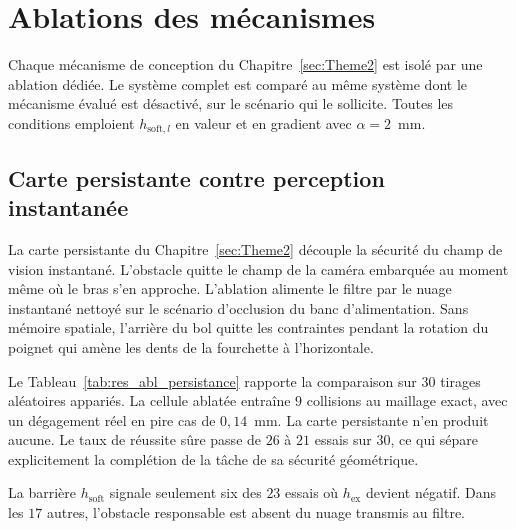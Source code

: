 \FloatBarrier

\section{Ablations des mécanismes}\label{sec:res_ablations}
Chaque mécanisme de conception du Chapitre~\ref{sec:Theme2} est isolé par une ablation dédiée. Le système complet est comparé au même système dont le mécanisme évalué est désactivé, sur le scénario qui le sollicite. Toutes les conditions emploient $h_{\mathrm{soft},l}$ en valeur et en gradient avec $\alpha=2$~mm.

\subsection{Carte persistante contre perception instantanée}\label{subsec:res_abl_persistance}
La carte persistante du Chapitre~\ref{sec:Theme2} découple la sécurité du champ de vision instantané. L'obstacle quitte le champ de la caméra embarquée au moment même où le bras s'en approche. L'ablation alimente le filtre par le nuage instantané nettoyé sur le scénario d'occlusion du banc d'alimentation. Sans mémoire spatiale, l'arrière du bol quitte les contraintes pendant la rotation du poignet qui amène les dents de la fourchette à l'horizontale.

Le Tableau~\ref{tab:res_abl_persistance} rapporte la comparaison sur $30$ tirages aléatoires appariés. La cellule ablatée entraîne $9$ collisions au maillage exact, avec un dégagement réel en pire cas de $0{,}14$~mm. La carte persistante n'en produit aucune. Le taux de réussite sûre passe de $26$ à $21$ essais sur $30$, ce qui sépare explicitement la complétion de la tâche de sa sécurité géométrique.

La barrière $h_{\mathrm{soft}}$ signale seulement six des $23$ essais où $h_{\mathrm{ex}}$ devient négatif. Dans les $17$ autres, l'obstacle responsable est absent du nuage transmis au filtre.

